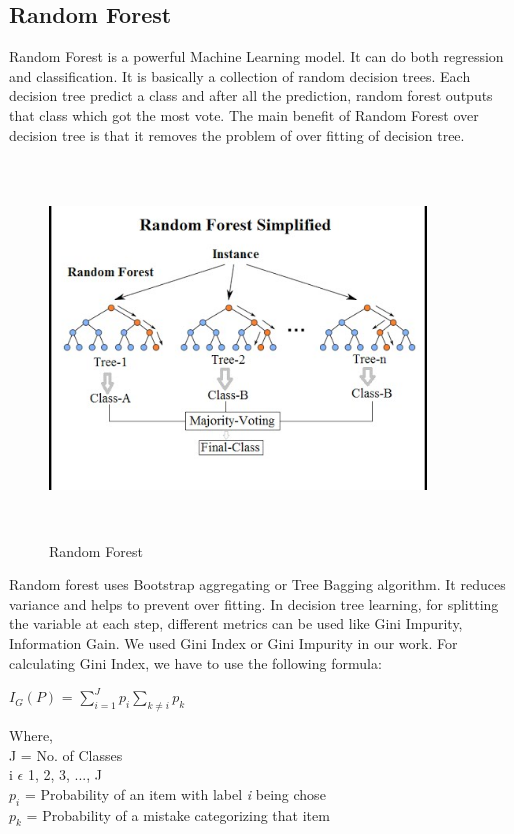 \documentclass[12pt,a4paper]{article}
\begin{document}
\subsection{Random Forest}
Random Forest is a powerful Machine Learning model. It can do both regression and classification.\cite{liaw2002classification} It is basically a collection of random decision trees. Each decision tree predict a class and after all the prediction, random forest outputs that class which got the most vote. The main benefit of Random Forest over decision tree is that it removes the problem of over fitting of decision tree.\cite{friedman2001elements} 
\begin{figure}[!htb]
  \includegraphics[width=10cm,height=10cm,keepaspectratio]{random_forest.jpg}
  \centering
  \caption{Random Forest}
  \label{fig:random_forest}
\end{figure}
Random forest uses Bootstrap aggregating or Tree Bagging algorithm. It reduces variance and helps to prevent over fitting. In decision tree learning, for splitting the variable at each step, different metrics can be used like Gini Impurity, Information Gain. We used Gini Index or Gini Impurity in our work. For calculating Gini Index, we have to use the following formula: \\
\centerline{$I_{G}(P)$ = $\sum_{i=1}^{J}p_{i}\sum_{k\neq{i}}p_{k}$}
Where,\\
J = No. of Classes\\
i $\epsilon$ {1, 2, 3, ..., J}\\
$p_{i}$ = Probability of an item with label \textit{i} being chose\\
$p_{k}$ = Probability of a mistake categorizing that item \cite{wiki:decisiontreelearning}
 
 

\end{document}
